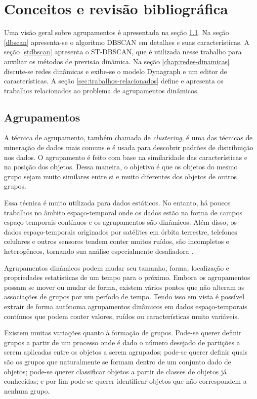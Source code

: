 \chapter{Conceitos e revisão bibliográfica}
\label{chap:estadodaarte}

Uma visão geral sobre agrupamentos é apresentada na seção \ref{agrupamentos}. Na seção \ref{dbscan} apresenta-se o algoritmo DBSCAN em detalhes e suas características. A seção \ref{stdbscan} apresenta o ST-DBSCAN, que é utilizada nesse trabalho para auxiliar os métodos de previsão dinâmica. Na seção  \ref{chap:redes-dinamicas}  discute-se redes dinâmicas e exibe-se o modelo Dynagraph e um editor de características. A seção \ref{sec:trabalhos-relacionados} define e apresenta os trabalhos relacionados ao problema de agrupamentos dinâmicos.

\section{Agrupamentos}
\label{agrupamentos}

A técnica de agrupamento, também chamada de \textit{clustering}, é uma das técnicas de mineração de dados mais comuns e é usada para descobrir padrões de distribuição nos dados. O agrupamento é feito com base na similaridade das características e na posição dos objetos. Dessa maneira, o objetivo é que os objetos do mesmo grupo sejam muito similares entre si e muito diferentes dos objetos de outros grupos.

Essa técnica é muito utilizada para dados estáticos. No entanto, há poucos trabalhos no âmbito espaço-temporal onde os dados estão na forma de campos espaço-temporais contínuos e os agrupamentos são dinâmicos. Além disso, os dados espaço-temporais originados por satélites em órbita terrestre, telefones celulares e outros sensores tendem conter muitos ruídos, são incompletos e heterogêneos, tornando sua análise especialmente desafiadora \cite{faghmous2013}.

Agrupamentos dinâmicos podem mudar seu tamanho, forma, localização e propriedades estatísticas de um tempo para o próximo. Embora os agrupamentos possam se mover ou mudar de forma, existem vários pontos que não alteram as associações de grupos por um período de tempo. Tendo isso em vista é possível extrair de forma autônoma agrupamentos dinâmicos em dados espaço-temporais contínuos que podem conter valores, ruídos ou características muito variáveis.

Existem muitas variações quanto à formação de grupos. Pode-se querer definir grupos a partir de um processo onde é dado o número desejado de partições a serem aplicadas entre os objetos a serem agrupados; pode-se querer definir quais são os grupos que naturalmente se formam dentro de um conjunto dado de objetos; pode-se querer classificar objetos a partir de classes de objetos já conhecidas; e por fim pode-se querer identificar objetos que não correspondem a nenhum grupo. 

